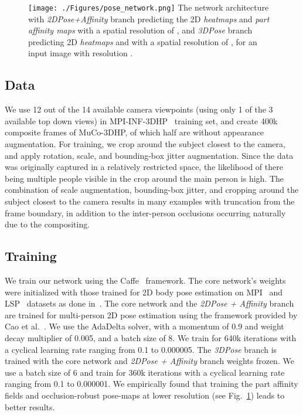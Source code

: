 \begin{figure}
  \centering
  \texttt{[image: ./Figures/pose\_network.png]}
  \vspace{-0.2cm}
  {
  The network architecture with \emph{2DPose+Affinity} branch predicting the 2D \emph{heatmaps}  and \emph{part affinity maps}  with a spatial resolution of , and \emph{3DPose} branch predicting 2D \emph{heatmaps}  and \newLocationMaps  with a spatial resolution of , for an input image with resolution .
  }  
  \vspace{-0.0cm}
  \label{fig:net_arch_branch}
\end{figure}


\subsection{Data}
We use 12 out of the 14 available camera viewpoints (using only 1 of the 3 available top down views) in MPI-INF-3DHP~\cite{mehta_mono_3dv17} training set, and create 400k composite frames of MuCo-3DHP, of which half are without appearance augmentation. 
For training, we crop around the subject closest to the camera, and apply rotation, scale, and bounding-box jitter augmentation.
Since the data was originally captured in a relatively restricted space, the likelihood of there being multiple people visible in the crop around the main person is high. The combination of scale augmentation, bounding-box jitter, and cropping around the subject closest to the camera results in many examples with truncation from the frame boundary, in addition to the inter-person occlusions occurring naturally due to the compositing.
\subsection{Training}
We train our network using the Caffe~\cite{jia_caffe_ICM} framework.
The core network's weights were initialized with those trained for 2D body pose estimation on MPI~\cite{andriluka_mpii2d_cvpr14} and LSP~\cite{johnson_lsp_bmvc10,johnson_lspet_cvpr11} datasets as done in~\cite{mehta_mono_3dv17}.
The core network and the \emph{2DPose + Affinity} branch are trained for multi-person 2D pose estimation using the framework provided by Cao et al.~\cite{cao_affinity_2017}. We use the AdaDelta solver, with a momentum of 0.9 and weight decay multiplier of 0.005, and a batch size of 8. We train for 640k iterations with a cyclical learning rate ranging from 0.1 to 0.000005.
The \emph{3DPose} branch is trained with the core network and \emph{2DPose + Affinity} branch weights frozen. We use a batch size of 6 and train for 360k iterations with a cyclical learning rate ranging from 0.1 to 0.000001.
We empirically found that training the part affinity fields and occlusion-robust pose-maps at lower resolution (see Fig.~\ref{fig:net_arch_branch}) leads to better results.

